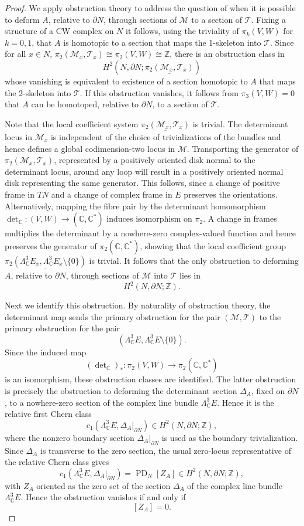 \documentclass[10pt,a4paper]{amsart}
\newcommand{\C}{\mathbb{C}}
\newcommand{\PD}{\operatorname{PD}}
\newcommand{\Z}{\mathbb{Z}}
\newcommand{\cM}{\mathcal{M}}
\newcommand{\cT}{\mathcal{T}}
\begin{document}
\begin{proof}
We apply obstruction theory to address the question of when it is possible to deform $A$, relative to $\partial N$, through sections of $\cM$ to a section of $\cT$. Fixing a structure of a CW complex on $N$ it follows, using the triviality of $\pi_k(V,W)$ for $k=0, 1$, that $A$ is homotopic to a section that maps the 1-skeleton into $\cT$. Since for all $x\in N$, $\pi_2(\cM_x,\cT_x) \cong \pi_2(V,W) \cong \Z$, there is an obstruction class in 
\[H^2\left(N,\partial N;\underline{\pi_2(\cM_x,\cT_x)}\right)\]
whose vanishing is equivalent to existence of a section homotopic to $A$ that maps the 2-skeleton into $\cT$. If this obstruction vanishes, it follows from $\pi_3(V,W) = 0$ that $A$ can be homotoped, relative to $\partial N$, to a section of $\cT$.

Note that the local coefficient system $\underline{\pi_2(\cM_x,\cT_x)}$ is trivial. The determinant locus in $\cM_x$ is independent of the choice of trivializations of the bundles and hence defines a global codimension-two locus in $\cM$. Transporting the generator of $\pi_2(\cM_x,\cT_x)$, represented by a positively oriented disk normal to the determinant locus, around any loop will result in a positively oriented normal disk representing the same generator. This follows, since a change of positive frame in $TN$ and a change of complex frame in $E$ preserves the orientations. Alternatively, mapping the fibre pair by the determinant homomorphism $\det_{\C} : (V,W) \to (\C,\C^*)$ induces isomorphism on $\pi_2$. A change in frames multiplies the determinant by a nowhere-zero complex-valued function and hence preserves the generator of $\pi_2(\C,\C^*)$, showing that the local coefficient group $\underline{\pi_2\left(\Lambda^3_{\C}E_x,\Lambda^3_{\C}E_x\setminus\{0\}\right)}$ is trivial. It follows that the only obstruction to deforming $A$, relative to $\partial N$, through sections of $\cM$ into $\cT$ lies in
\[H^2(N,\partial N;\Z).\]

Next we identify this obstruction. By naturality of obstruction theory, the determinant map sends the primary obstruction for the pair $(\cM,\cT)$ to the primary obstruction for the pair
\[\left(\Lambda^3_{\C}E,\Lambda^3_{\C}E\setminus\{0\}\right).\]
Since the induced map
\[(\det\nolimits_\C)_*:\pi_2(V,W)\longrightarrow \pi_2(\mathbb C,\mathbb C^*)\]
is an isomorphism, these obstruction classes are identified. The latter obstruction is precisely the obstruction to deforming the determinant section $\Delta_A$, fixed on $\partial N$, to a nowhere-zero section of the complex line bundle $\Lambda^3_{\mathbb C}E$. Hence it is the relative first Chern class
\[c_1\left(\Lambda^3_{\mathbb C}E,\Delta_A|_{\partial N}\right)\in H^2(N,\partial N;\mathbb Z),\]
where the nonzero boundary section \(\Delta_A|_{\partial N}\) is used as the boundary trivialization. Since $\Delta_A$ is transverse to the zero section, the usual zero-locus representative of the relative Chern class gives
\[c_1\left(\Lambda^3_{\C}E,\Delta_A|_{\partial N}\right) =\PD_N[Z_A]\in H^2(N,\partial N;\Z),\]
with $Z_A$ oriented as the zero set of the section $\Delta_A$ of the complex line bundle $\Lambda^3_{\C}E$. Hence the obstruction vanishes if and only if
\[ [Z_A]=0.\]


\end{proof}
\end{document}
